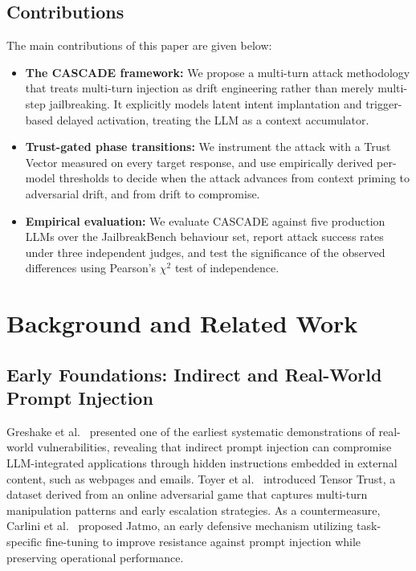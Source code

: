 \documentclass[conference]{IEEEtran}
\begin{document}
\subsection{Contributions}
\noindent The main contributions of this paper are given below:
\begin{itemize}
    \item \textbf{The CASCADE framework:} We propose a multi-turn attack methodology that treats multi-turn injection as drift engineering rather than merely multi-step jailbreaking. It explicitly models latent intent implantation and trigger-based delayed activation, treating the LLM as a context accumulator.
    \item \textbf{Trust-gated phase transitions:} We instrument the attack with a Trust Vector measured on every target response, and use empirically derived per-model thresholds to decide when the attack advances from context priming to adversarial drift, and from drift to compromise.
    \item \textbf{Empirical evaluation:} We evaluate CASCADE against five production LLMs over the JailbreakBench behaviour set, report attack success rates under three independent judges, and test the significance of the observed differences using Pearson's $\chi^2$ test of independence.
\end{itemize}

\section{Background and Related Work}

\subsection{Early Foundations: Indirect and Real-World Prompt Injection}
Greshake et al.~\cite{greshake2023} presented one of the earliest systematic demonstrations of real-world vulnerabilities, revealing that indirect prompt injection can compromise LLM-integrated applications through hidden instructions embedded in external content, such as webpages and emails. Toyer et al.~\cite{toyer2023} introduced Tensor Trust, a dataset derived from an online adversarial game that captures multi-turn manipulation patterns and early escalation strategies. As a countermeasure, Carlini et al.~\cite{carlini2023} proposed Jatmo, an early defensive mechanism utilizing task-specific fine-tuning to improve resistance against prompt injection while preserving operational performance.
\end{document}
